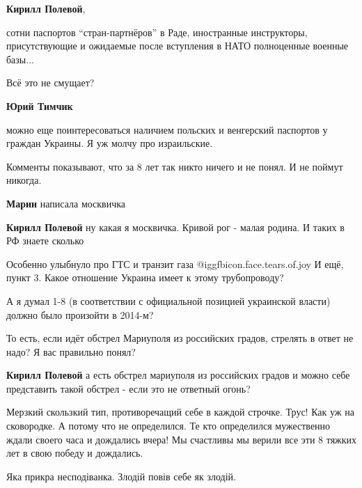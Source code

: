 \begin{itemize}
\begin{itemize}
\textbf{Кирилл Полевой}, 

сотни паспортов \enquote{стран-партнёров} в Раде, иностранные инструкторы,
присутствующие и ожидаемые после вступления в НАТО полноценные военные базы...

Всё это не смущает?

\textbf{Юрий Тимчик} 

можно еще поинтересоваться наличием польских и венгерский паспортов у граждан
Украины. Я уж молчу про израильские.

\end{itemize} %


Комменты показывают, что за 8 лет так никто ничего и не понял. И не поймут
никогда.

\begin{itemize} %
\textbf{Марин} написала москвичка

\textbf{Кирилл Полевой} ну какая я москвичка. Кривой рог - малая родина. И таких в РФ знаете сколько
\end{itemize} %


Особенно улыбнуло про ГТС и транзит газа @igg{fbicon.face.tears.of.joy}  И ещё,
пункт 3. Какое отношение Украина имеет к этому трубопроводу?

А я думал 1-8 (в соответствии с официальной позицией украинской власти) должно было произойти в 2014-м?

То есть, если идёт обстрел Мариуполя из российских градов, стрелять в ответ не надо? Я вас правильно понял?

\begin{itemize} %
\textbf{Кирилл Полевой} а есть обстрел мариуполя из российских градов и можно себе представить такой обстрел - если это не ответный огонь?
\end{itemize} %


Мерзкий скользкий тип, противоречащий себе в каждой строчке. Трус! Как уж на
сковородке. А потому что не определился. Те кто определился мужественно ждали
своего часа и дождались вчера! Мы счастливы мы верили все эти 8 тяжких лет в
свою победу и дождались.

Яка прикра несподіванка. Злодій повів себе як злодій.


\end{itemize}

